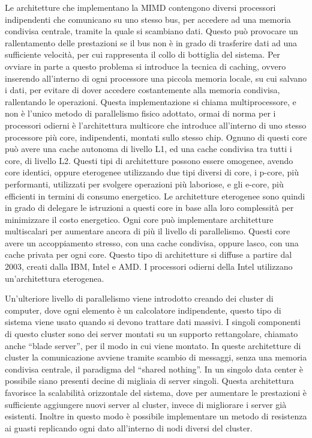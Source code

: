 \documentclass{article}
\numberwithin{equation}{subsection}
\begin{document}
Le architetture che implementano la MIMD contengono diversi processori indipendenti che comunicano su uno stesso bus, per accedere ad una memoria condivisa centrale, tramite la quale si scambiano dati. Questo può 
provocare un rallentamento delle prestazioni se il bus non è in grado di trasferire dati ad una sufficiente velocità, per cui rappresenta il collo di bottiglia del sistema. Per ovviare in parte a questo problema 
si introduce la tecnica di caching, ovvero inserendo all'interno di ogni processore una piccola memoria locale, su cui salvano i dati, per evitare di dover accedere costantemente alla memoria condivisa, rallentando 
le operazioni. 
Questa implementazione si chiama multiprocessore, e non è l'unico metodo di parallelismo fisico adottato, ormai di norma per i processori odierni è l'architettura multicore che introduce all'interno di uno stesso 
processore più core, indipendenti, montati sullo stesso chip. Ognuno di questi core può avere una cache autonoma di livello L1, ed una cache condivisa tra tutti i core, di livello L2. 
Questi tipi di architetture possono essere omogenee, avendo core identici, oppure eterogenee utilizzando due tipi diversi di core, i p-core, più performanti, utilizzati per svolgere operazioni più laboriose, e 
gli e-core, più efficienti in termini di consumo energetico. Le architetture eterogenee sono quindi in grado di delegare le istruzioni a questi core in base alla loro complessità per minimizzare il costo energetico. 
Ogni core può implementare architetture multiscalari per aumentare ancora di più il livello di parallelismo. Questi core avere un accoppiamento stresso, con una cache condivisa, oppure lasco, con una cache privata 
per ogni core. 
Questo tipo di architetture si diffuse a partire dal 2003, creati dalla IBM, Intel e AMD. I processori odierni della Intel utilizzano un'architettura eterogenea. 

Un'ulteriore livello di parallelismo viene introdotto creando dei cluster di computer, dove ogni elemento è un calcolatore indipendente, questo tipo di sistema viene usato quando si devono trattare dati massivi. 
I singoli componenti di questo cluster sono dei server montati su un supporto rettangolare, chiamato anche ``blade server'', per il modo in cui viene montato. In queste architetture di cluster la comunicazione avviene 
tramite scambio di messaggi, senza una memoria condivisa centrale, il paradigma del ``shared nothing''. 
In un singolo data center è possibile siano presenti decine di migliaia di server singoli. Questa architettura favorisce la scalabilità orizzontale del sistema, dove per aumentare le prestazioni è sufficiente 
aggiungere nuovi server al cluster, invece di migliorare i server già esistenti. Inoltre in questo modo è possibile implementare un metodo di resistenza ai guasti replicando ogni dato all'interno di nodi diversi 
del cluster. 
\end{document}
